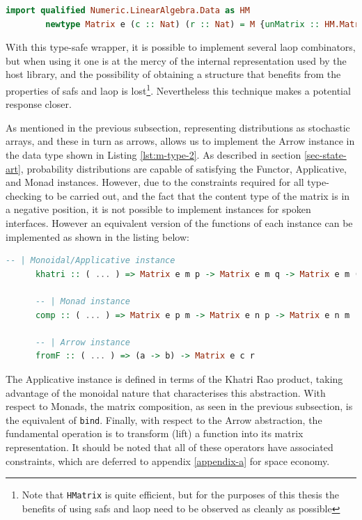 \documentclass[
  oneside,
  11pt, a4paper,
  footinclude=true,
  headinclude=true,
  cleardoublepage=empty
]{scrbook}
\theoremstyle{definition}
\theoremstyle{definition}
\begin{document}
        \begin{lstlisting}[language=Haskell, label={lst:m-type-2}, caption={Type-safe wrapper around HMatrix},captionpos=b]
        import qualified Numeric.LinearAlgebra.Data as HM
        newtype Matrix e (c :: Nat) (r :: Nat) = M {unMatrix :: HM.Matrix e}
        \end{lstlisting}{}
        
        With this type-safe wrapper, it is possible to implement several \gls{laop} combinators, but when using it one is at the mercy of the internal representation used by the host library, and the possibility of obtaining a structure that benefits from the properties of \glspl{saf} and \gls{laop} is lost\footnote{Note that \texttt{HMatrix} is quite efficient, but for the purposes of this thesis the benefits of using \glspl{saf} and \gls{laop} need to be observed as cleanly as possible}. Nevertheless this technique makes a potential response closer.
        
        As mentioned in the previous subsection, representing distributions as stochastic arrays, and these in turn as arrows, allows us to implement the Arrow instance in the data type shown in Listing \ref{lst:m-type-2}. As described in section \ref{sec-state-art}, probability distributions are capable of satisfying the Functor, Applicative, and Monad instances. However, due to the constraints required for all type-checking to be carried out, and the fact that the content type of the matrix is in a negative position, it is not possible to implement instances for spoken interfaces. However an equivalent version of the functions of each instance can be implemented as shown in the listing below:
        
        \begin{lstlisting}[language=Haskell, caption={Interface equivalent function implementations},captionpos=b]
        -- | Monoidal/Applicative instance
      khatri :: ( ... ) => Matrix e m p -> Matrix e m q -> Matrix e m (p * q)

      -- | Monad instance
      comp :: ( ... ) => Matrix e p m -> Matrix e n p -> Matrix e n m

      -- | Arrow instance
      fromF :: ( ... ) => (a -> b) -> Matrix e c r
        \end{lstlisting}{}
        
        The Applicative instance is defined in terms of the Khatri Rao product, taking advantage of the monoidal nature that characterises this abstraction. With respect to Monads, the matrix composition, as seen in the previous subsection, is the equivalent of \texttt{bind}. Finally, with respect to the Arrow abstraction, the fundamental operation is to transform (lift) a function into its matrix representation. It should be noted that all of these operators have associated constraints, which are deferred to appendix \ref{appendix-a} for space economy.
        
\end{document}
